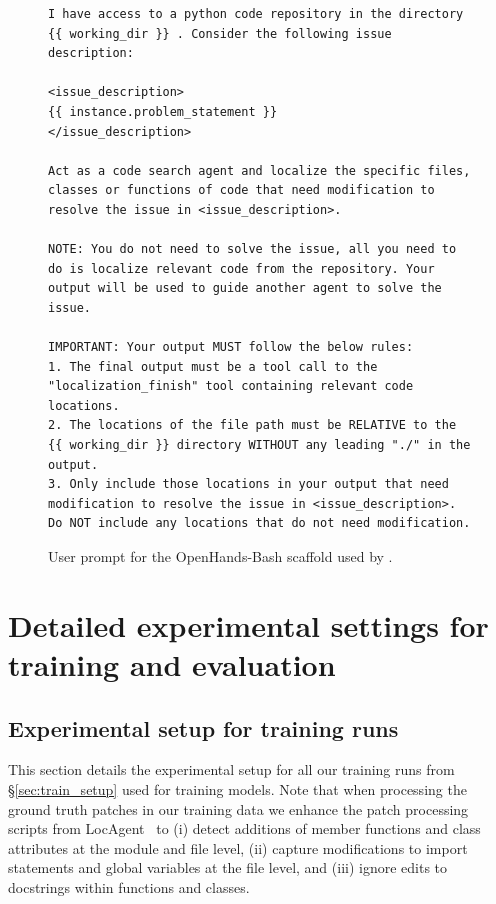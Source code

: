 \begin{figure}[!ht]
    \centering
\begin{tcolorbox}[colback=orange!6!white, colframe=orange!75!black, title=User prompt for the OpenHands-Bash agent used by \methodname]
\begin{lstlisting}
I have access to a python code repository in the directory {{ working_dir }} . Consider the following issue description:

<issue_description>
{{ instance.problem_statement }}
</issue_description>

Act as a code search agent and localize the specific files, classes or functions of code that need modification to resolve the issue in <issue_description>.

NOTE: You do not need to solve the issue, all you need to do is localize relevant code from the repository. Your output will be used to guide another agent to solve the issue.

IMPORTANT: Your output MUST follow the below rules:
1. The final output must be a tool call to the "localization_finish" tool containing relevant code locations.
2. The locations of the file path must be RELATIVE to the {{ working_dir }} directory WITHOUT any leading "./" in the output.
3. Only include those locations in your output that need modification to resolve the issue in <issue_description>. Do NOT include any locations that do not need modification.
\end{lstlisting}
\end{tcolorbox}
\caption{User prompt for the OpenHands-Bash scaffold used by \methodname.}
\label{fig:user_prompt}
\end{figure}


\section{Detailed experimental settings for training and evaluation}\label{appendix:experimental_setup}

\subsection{Experimental setup for training runs}\label{appendix:train_hyperparams}
This section details the experimental setup for all our training runs from \S\ref{sec:train_setup} used for training \methodname models. Note that when processing the ground truth patches in our training data we enhance the patch processing scripts from LocAgent~\citep{chen-etal-2025-locagent} to (i) detect additions of member functions and class attributes at the module and file level, (ii) capture modifications to import statements and global variables at the file level, and (iii) ignore edits to docstrings within functions and classes. 


